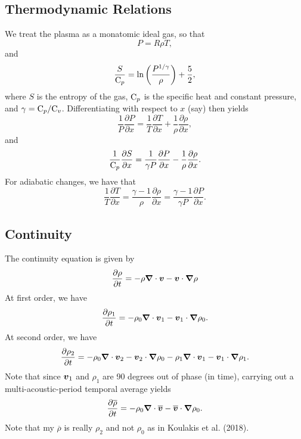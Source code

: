 \subsection{Thermodynamic Relations}
We treat the plasma as a monatomic ideal gas, so that 
\begin{equation}
P=R\rho T,
\end{equation}
and
\begin{equation}
\frac{S}{\mathrm{C}_p} = \mathrm{ln}\left(\frac{P^{1/\gamma}}{\rho} \right)+\frac{5}{2},
\end{equation}
where $S$ is the entropy of the gas, $\mathrm{C}_p$ is the specific heat and constant pressure, and $\gamma=\mathrm{C}_p/\mathrm{C}_v$.  Differentiating with respect to $x$ (say) then yields
\begin{equation}
\frac{1}{P}\frac{\partial P}{\partial x} = \frac{1}{T}\frac{\partial T}{\partial x}+\frac{1}{\rho}\frac{\partial \rho}{\partial x},
\end{equation} 
and
\begin{equation}
\frac{1}{\mathrm{C}_p}\frac{\partial S}{\partial x} = \frac{1}{\gamma P }\frac{\partial P}{\partial x} - \frac{1}{\rho}\frac{\partial \rho}{\partial x}.
\end{equation}
For adiabatic changes, we have that
\begin{equation}
\label{eq:adiabatic}
\frac{1}{T}\frac{\partial T}{\partial x} = 
\frac{\gamma-1}{\rho}\frac{\partial \rho}{\partial x} =
\frac{\gamma-1}{\gamma P}\frac{\partial P}{\partial x}.
\end{equation}

\subsection{Continuity}
The continuity equation is given by
\begin{equation}
\frac{\partial \rho}{\partial t} = -\rho\boldsymbol{\nabla}\cdot\boldsymbol{v}-\boldsymbol{v}\cdot\boldsymbol{\nabla}\rho
\end{equation}
At first order, we have
\begin{equation}
\label{eq:firstorder}
\frac{\partial \rho_1}{\partial t} = - \rho_0\boldsymbol{\nabla}\cdot\boldsymbol{v}_1 - \boldsymbol{v}_1\cdot\boldsymbol{\nabla}\rho_0. 
\end{equation}
At second order, we have
\begin{equation}
\frac{\partial \rho_2}{\partial t} = - \rho_0\boldsymbol{\nabla}\cdot\boldsymbol{v}_2 - \boldsymbol{v}_2\cdot\boldsymbol{\nabla}\rho_0 - \rho_1\boldsymbol{\nabla}\cdot\boldsymbol{v}_1 - \boldsymbol{v}_1\cdot\boldsymbol{\nabla}\rho_1.
\end{equation}
Note that since $\boldsymbol{v}_1$ and $\rho_1$ are 90 degrees out of phase (in time), carrying out a multi-acoustic-period temporal average yields
\begin{equation}
\frac{\partial \overline{\rho}}{\partial t} = - \rho_0\boldsymbol{\nabla}\cdot\overline{\boldsymbol{v}} - \overline{\boldsymbol{v}}\cdot\boldsymbol{\nabla}\rho_0. 
\end{equation}
Note that my $\overline{\rho}$ is really $\rho_2$ and not $\rho_0$ as in Koulakis et al. (2018).


